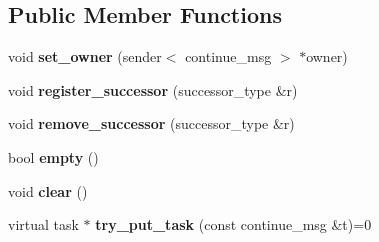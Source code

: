 \subsection*{Public Member Functions}
\begin{DoxyCompactItemize}
\item 
\hypertarget{classinternal_1_1successor__cache_3_01continue__msg_01_4_a4333622a4088707b779a66bc67836012}{}void {\bfseries set\+\_\+owner} (sender$<$ continue\+\_\+msg $>$ $\ast$owner)\label{classinternal_1_1successor__cache_3_01continue__msg_01_4_a4333622a4088707b779a66bc67836012}

\item 
\hypertarget{classinternal_1_1successor__cache_3_01continue__msg_01_4_a8a648ca6fc131591fece1ad2062d1693}{}void {\bfseries register\+\_\+successor} (successor\+\_\+type \&r)\label{classinternal_1_1successor__cache_3_01continue__msg_01_4_a8a648ca6fc131591fece1ad2062d1693}

\item 
\hypertarget{classinternal_1_1successor__cache_3_01continue__msg_01_4_aff02d94171df717e840b7b2ee0779a33}{}void {\bfseries remove\+\_\+successor} (successor\+\_\+type \&r)\label{classinternal_1_1successor__cache_3_01continue__msg_01_4_aff02d94171df717e840b7b2ee0779a33}

\item 
\hypertarget{classinternal_1_1successor__cache_3_01continue__msg_01_4_a9206a594aec863e8bdb8531eb139f70a}{}bool {\bfseries empty} ()\label{classinternal_1_1successor__cache_3_01continue__msg_01_4_a9206a594aec863e8bdb8531eb139f70a}

\item 
\hypertarget{classinternal_1_1successor__cache_3_01continue__msg_01_4_ac47222cba775bfdcf7cf98039f1e2c74}{}void {\bfseries clear} ()\label{classinternal_1_1successor__cache_3_01continue__msg_01_4_ac47222cba775bfdcf7cf98039f1e2c74}

\item 
\hypertarget{classinternal_1_1successor__cache_3_01continue__msg_01_4_a98ae75ef6588b43ab1d90607d4982798}{}virtual task $\ast$ {\bfseries try\+\_\+put\+\_\+task} (const continue\+\_\+msg \&t)=0\label{classinternal_1_1successor__cache_3_01continue__msg_01_4_a98ae75ef6588b43ab1d90607d4982798}

\end{DoxyCompactItemize}
